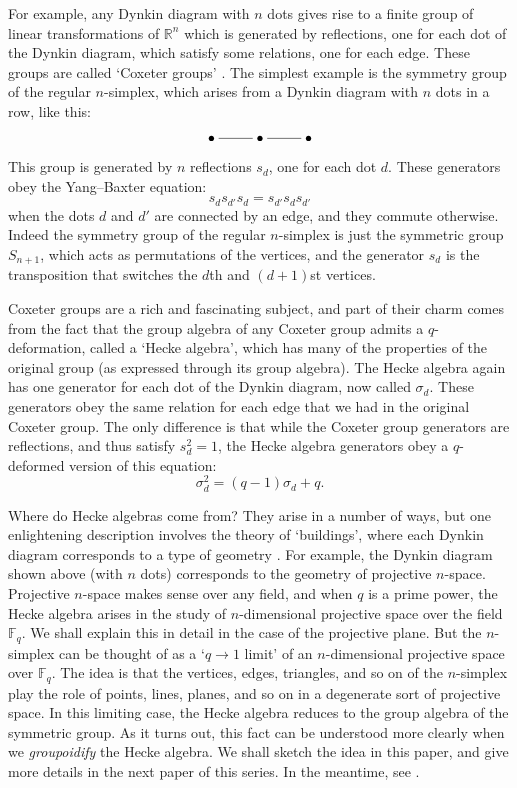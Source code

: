 \documentclass{article}
\renewcommand{\to}{\rightarrow}
\newcommand{\R}{{\mathbb R}}
\newcommand{\F}{{\mathbb F}}
\begin{document}
For example, any Dynkin diagram with $n$ dots gives rise to a finite
group of linear transformations of $\R^n$ which is generated by
reflections, one for each dot of the Dynkin diagram, which satisfy
some relations, one for each edge.  These groups are called `Coxeter
groups' \cite{Humphreys}.  The simplest example is the symmetry group 
of the regular $n$-simplex, which arises from a Dynkin diagram with
$n$ dots in a row, like this:
\[\xymatrix{ \bullet\ar@{-}[r] & \bullet \ar@{-}[r] & \bullet}\]
This group is generated by $n$ reflections $s_d$, one for each dot
$d$.  These generators obey the Yang--Baxter equation:
\[  s_d s_{d'} s_d = s_{d'} s_d s_{d'} \]
when the dots $d$ and $d'$ are connected by an edge, and they commute
otherwise.  Indeed the symmetry group of the regular $n$-simplex is
just the symmetric group $S_{n+1}$, which acts as permutations of the
vertices, and the generator $s_d$ is the transposition that switches
the $d$th and $(d+1)$st vertices.

Coxeter groups are a rich and fascinating subject, and part of their
charm comes from the fact that the group algebra of any Coxeter group
admits a $q$-deformation, called a `Hecke algebra', which has many of
the properties of the original group (as expressed through its group
algebra).  The Hecke algebra again has one generator for each dot of
the Dynkin diagram, now called $\sigma_d$.  These generators obey
the same relation for each edge that we had in the original Coxeter
group.  The only difference is that while the Coxeter group generators
are reflections, and thus satisfy $s_d^2 = 1$, the Hecke algebra
generators obey a $q$-deformed version of this equation:
\[ \sigma_d^2 = (q-1)\sigma_d + q  . \]

Where do Hecke algebras come from?  They arise in a number of ways,
but one enlightening description involves the theory of `buildings',
where each Dynkin diagram corresponds to a type of geometry
\cite{Brown,Garrett}.  For example, the Dynkin diagram shown above
(with $n$ dots) corresponds to the geometry of projective $n$-space.
Projective $n$-space makes sense over any field, and when $q$ is a
prime power, the Hecke algebra arises in the study of $n$-dimensional 
projective space over the field $\F_q$.  We shall explain this in
detail in the case of the projective plane.  But the $n$-simplex can be 
thought of as a `$q \to 1$ limit' of an $n$-dimensional projective
space over $\F_q$.  The idea is that the vertices, edges, triangles,
and so on of the $n$-simplex play the role of points, lines, planes,
and so on in a degenerate sort of projective space.  In this limiting case,
the Hecke algebra reduces to the group algebra of the symmetric group.  
As it turns out, this fact can be understood more clearly when we 
\textit{groupoidify} the Hecke algebra.  We shall sketch the idea in 
this paper, and give more details in the next paper of this series.  
In the meantime, see \cite{Hoffnung}.
\end{document}
